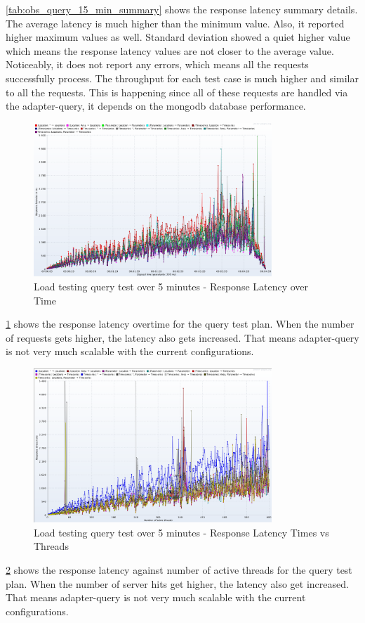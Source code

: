 \cref{tab:obs_query_15_min_summary} shows the response latency summary details. The average latency is much higher than the minimum value. Also, it reported higher maximum values as well. Standard deviation showed a quiet higher value which means the response latency values are not closer to the average value. Noticeably, it does not report any errors, which means all the requests successfully process.
The throughput for each test case is much higher and similar to all the requests. This is happening since all of these requests are handled via the adapter-query, it depends on the \acrshort{mongodb} database performance.

\begin{figure}[htp]
    \centering
    \includegraphics[width=0.8\textwidth]{results/obs/query/obs_query_5m_latency_over_time.png}
    \caption{Load testing query test over 5 minutes - Response Latency over Time}
    \label{fi:test_obs_query_5m_response_latency}
\end{figure}
\cref{fi:test_obs_query_5m_response_latency} shows the response latency overtime for the query test plan. When the number of requests gets higher, the latency also gets increased. That means adapter-query is not very much scalable with the current configurations.

\begin{figure}[htp]
    \centering
    \includegraphics[width=0.8\textwidth]{results/obs/query/obs_query_5m_response_times_vs_threads.png}
    \caption{Load testing query test over 5 minutes - Response Latency Times vs Threads}
    \label{fi:test_obs_query_5m_response_times_vs_threads}
\end{figure}
\cref{fi:test_obs_query_5m_response_times_vs_threads} shows the response latency against number of active threads for the query test plan. When the number of server hits get higher, the latency also get increased. That means adapter-query is not very much scalable with the current configurations.

